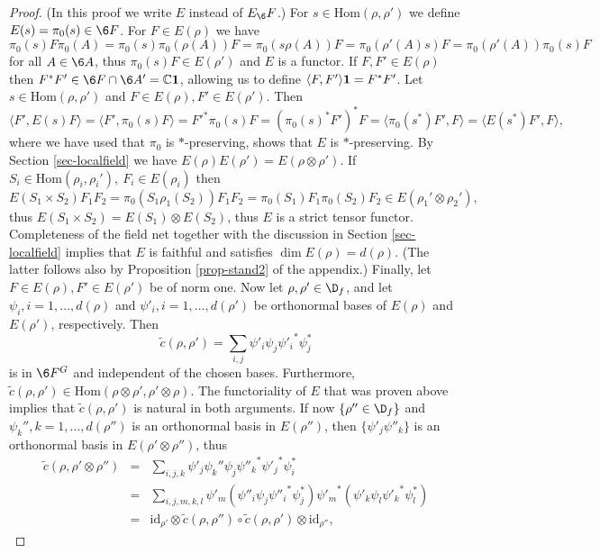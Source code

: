 \documentclass[11pt]{article}
\theoremstyle{definition}
\theoremstyle{definition}
\theoremstyle{remark}
\def\7#1{{\mathbb #1}}
\def\1#1{{\bf #1}}
\newcommand{\Hom}{\mathrm{Hom}}
\def\id{\mathrm{id}}
\begin{document}
\begin{proof} (In this proof we write $E$ instead of $E_\6F$.) For $s\in\Hom(\rho,\rho')$ we define
$E(s)=\pi_0(s)\in\6F$. For $F\in E(\rho)$ we have  
$\pi_0(s)F\pi_0(A)=\pi_0(s)\pi_0(\rho(A))F=\pi_0(s\rho(A))F=\pi_0(\rho'(A)s)F=\pi_0(\rho'(A))\pi_0(s)F$
for all $A\in\6A$, thus $\pi_0(s)F\in E(\rho')$ and $E$ is a functor. If $F,F'\in E(\rho)$ then
$F^*F'\in\6F\cap\6A'=\7C\11$, allowing us to define $\langle F,F'\rangle\11=F^*F'$.
Let $s\in\Hom(\rho,\rho')$ and $F\in E(\rho),F'\in E(\rho')$. Then 
\[ \langle F',E(s)F\rangle=\langle F',\pi_0(s)F\rangle={F'}^*\pi_0(s)F
  =(\pi_0(s)^*F')^*F =\langle\pi_0(s^*)F',F\rangle=\langle E(s^*)F',F\rangle, \]
where we have used that $\pi_0$ is $*$-preserving, shows that $E$ is $*$-preserving.
By Section \ref{sec-localfield} we have $E(\rho)E(\rho')=E(\rho\otimes\rho')$. If
$S_i\in\Hom(\rho_i,\rho_i'), \ F_i\in E(\rho_i)$ then 
\[ E(S_1\times
S_2)F_1F_2=\pi_0(S_1\rho_1(S_2))F_1F_2=\pi_0(S_1)F_1\pi_0(S_2)F_2
\in E(\rho_1'\otimes\rho_2'), \] thus $E(S_1\times
S_2)=E(S_1)\otimes E(S_2)$, thus $E$ is a strict tensor
functor.  Completeness of the field net together with
the discussion in Section \ref{sec-localfield} implies
that $E$ is faithful and satisfies $\dim
E(\rho)=d(\rho)$. (The latter follows also by
Proposition \ref{prop-stand2} of the appendix.)
Finally, let $F\in E(\rho), F'\in E(\rho')$ be of norm
one. Now let $\rho,\rho'\in\D_f$, and let $\psi_i,
i=1,\ldots,d(\rho)$ and $\psi'_i, i=1,\ldots,d(\rho')$
be orthonormal bases of $E(\rho)$ and $E(\rho')$,
respectively. Then
\[ \tilde{c}(\rho,\rho')=\sum_{i,j}\psi'_i\psi_j{\psi'_i}^*\psi_j^* \]
is in $\6F^G$ and independent of the chosen bases. Furthermore,
$\tilde{c}(\rho,\rho')\in\Hom(\rho\otimes\rho',\rho'\otimes\rho)$. The functoriality of $E$ that was
proven above implies that $\tilde{c}(\rho,\rho')$ is natural in both arguments. If now
$\{\rho''\in\D_f\}$ and $\psi_k'', k=1,\ldots,d(\rho'')$ is an orthonormal basis in $E(\rho'')$,
then $\{\psi'_j\psi''_k\}$ is an orthonormal  basis in $E(\rho'\otimes\rho'')$, thus 
\begin{eqnarray*}
  \tilde{c}(\rho,\rho'\otimes\rho'')&=&
\sum_{i,j,k}\psi'_j\psi_k''\psi_j{\psi''_k}^*{\psi'_j}^*\psi_i^* \\
  &=&\sum_{i,j,m,k,l} \psi'_m (\psi''_i\psi_j{\psi''_i}^*\psi_j^*) {\psi'_m}^*
    (\psi'_k\psi_l{\psi'_k}^*\psi_l^*) \\
   &=& \id_{\rho'}\otimes\tilde{c}(\rho,\rho'')\circ\tilde{c}(\rho,\rho')\otimes\id_{\rho''},
\end{eqnarray*}

\end{proof}
\end{document}
